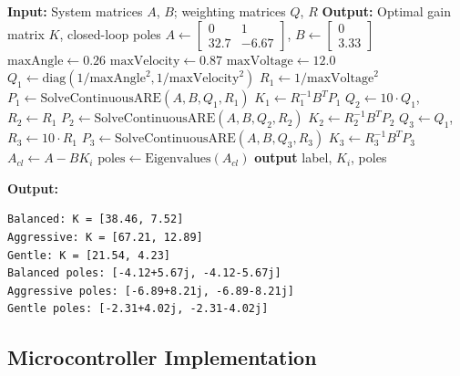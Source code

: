 \begin{algorithm}[H]
\caption{LQR Controller Design}
\begin{algorithmic}[1]
\State \textbf{Input:} System matrices $A$, $B$; weighting matrices $Q$, $R$
\State \textbf{Output:} Optimal gain matrix $K$, closed-loop poles
\State
\State {}
\State $A \gets \begin{bmatrix} 0 & 1 \\ 32.7 & -6.67 \end{bmatrix}$, \quad $B \gets \begin{bmatrix} 0 \\ 3.33 \end{bmatrix}$
\State
\State {}
\State $\text{maxAngle} \gets 0.26$ 
\State $\text{maxVelocity} \gets 0.87$ 
\State $\text{maxVoltage} \gets 12.0$
\State $Q_1 \gets \text{diag}(1/\text{maxAngle}^2, 1/\text{maxVelocity}^2)$
\State $R_1 \gets 1/\text{maxVoltage}^2$
\State $P_1 \gets \text{SolveContinuousARE}(A, B, Q_1, R_1)$
\State $K_1 \gets R_1^{-1} B^T P_1$
\State
\State {}
\State $Q_2 \gets 10 \cdot Q_1$, \quad $R_2 \gets R_1$
\State $P_2 \gets \text{SolveContinuousARE}(A, B, Q_2, R_2)$
\State $K_2 \gets R_2^{-1} B^T P_2$
\State
\State {}
\State $Q_3 \gets Q_1$, \quad $R_3 \gets 10 \cdot R_1$
\State $P_3 \gets \text{SolveContinuousARE}(A, B, Q_3, R_3)$
\State $K_3 \gets R_3^{-1} B^T P_3$
\State
\State {}
    \State $A_{cl} \gets A - B K_i$
    \State $\text{poles} \gets \text{Eigenvalues}(A_{cl})$
    \State \textbf{output} label, $K_i$, poles
\EndFor
\end{algorithmic}
\end{algorithm}

\textbf{Output:}
\begin{verbatim}
Balanced: K = [38.46, 7.52]
Aggressive: K = [67.21, 12.89]
Gentle: K = [21.54, 4.23]
Balanced poles: [-4.12+5.67j, -4.12-5.67j]
Aggressive poles: [-6.89+8.21j, -6.89-8.21j]
Gentle poles: [-2.31+4.02j, -2.31-4.02j]
\end{verbatim}

\subsection{Microcontroller Implementation}

